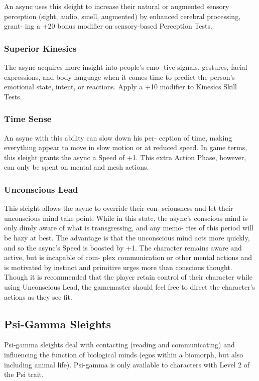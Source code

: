An async uses this sleight to increase their natural or 
augmented sensory perception (sight, audio, smell, 
augmented) by enhanced cerebral processing, grant-
ing a +20 bonus modifier on sensory-based Perception 
Tests.

\subsubsection{Superior Kinesics}

The async acquires more insight into people's emo-
tive signals, gestures, facial expressions, and body 
language when it comes time to predict the person's 
emotional state, intent, or reactions. Apply a +10 
modifier to Kinesics Skill Tests.

\subsubsection{Time Sense}

An async with this ability can slow down his per-
ception of time, making everything appear to move 
in slow motion or at reduced speed. In game terms, 
this sleight grants the async a Speed of +1. This extra 
Action Phase, however, can only be spent on mental 
and mesh actions.

\subsubsection{Unconscious Lead}

This sleight allows the async to override their con-
sciousness and let their unconscious mind take point. 
While in this state, the async's conscious mind is only 
dimly aware of what is transgressing, and any memo-
ries of this period will be hazy at best. The advantage 
is that the unconscious mind acts more quickly, and 
so the async's Speed is boosted by +1. The character 
remains aware and active, but is incapable of com-
plex communication or other mental actions and is 
motivated by instinct and primitive urges more than 
conscious thought. Though it is recommended that 
the player retain control of their character while using 
Unconscious Lead, the gamemaster should feel free to 
direct the character's actions as they see fit.

\subsection{Psi-Gamma Sleights}

Psi-gamma sleights deal with contacting (reading 
and communicating) and influencing the function of 
biological minds (egos within a biomorph, but also 
including animal life). Psi-gamma is only available to 
characters with Level 2 of the Psi trait.

